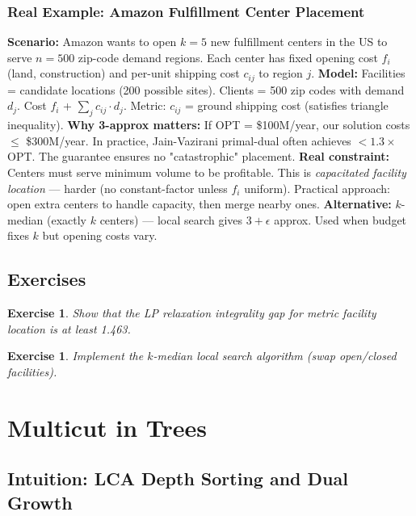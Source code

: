 \documentclass[11pt,oneside]{book}
\newtheorem{exercise}[theorem]{Exercise}
\begin{document}
\subsection*{Real Example: Amazon Fulfillment Center Placement}
\textbf{Scenario:} Amazon wants to open $k=5$ new fulfillment centers in the US to serve $n=500$ zip-code demand regions. Each center has fixed opening cost $f_i$ (land, construction) and per-unit shipping cost $c_{ij}$ to region $j$.
\textbf{Model:} Facilities = candidate locations (200 possible sites). Clients = 500 zip codes with demand $d_j$. Cost $f_i$ + $\sum_j c_{ij} \cdot d_j$. Metric: $c_{ij}$ = ground shipping cost (satisfies triangle inequality).
\textbf{Why 3-approx matters:} If OPT = \$100M/year, our solution costs $\leq$ \$300M/year. In practice, Jain-Vazirani primal-dual often achieves $< 1.3\times$ OPT. The guarantee ensures no "catastrophic" placement.
\textbf{Real constraint:} Centers must serve minimum volume to be profitable. This is \emph{capacitated facility location} — harder (no constant-factor unless $f_i$ uniform). Practical approach: open extra centers to handle capacity, then merge nearby ones.
\textbf{Alternative:} $k$-median (exactly $k$ centers) — local search gives $3+\epsilon$ approx. Used when budget fixes $k$ but opening costs vary.

\section{Exercises}
\begin{exercise}
Show that the LP relaxation integrality gap for metric facility location is at least 1.463.
\end{exercise}
\begin{exercise}
Implement the $k$-median local search algorithm (swap open/closed facilities).
\end{exercise}

\setcounter{chapter}{29}
\chapter{Multicut in Trees}
\label{ch:tree_multicut}

\section{Intuition: LCA Depth Sorting and Dual Growth}
\end{document}

